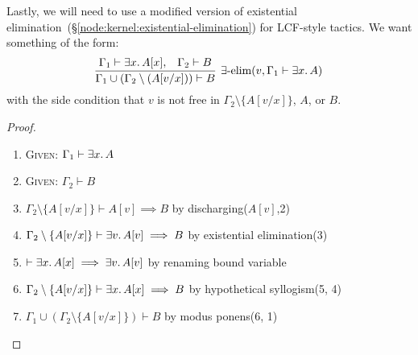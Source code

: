 \begin{node}\label{node:derived:existential-elimination}
Lastly, we will need to use a modified version of existential
elimination~(\S\ref{node:kernel:existential-elimination}) for
LCF-style tactics. We want something of the form:
\begin{equation*}
\vcenter{\infer[\exists\mbox{-elim}(v,\Gamma_{1}\vdash\exists x\ldotp A)]%
  {\Gamma_{1}\cup(\Gamma_{2}\setminus(A[v/x]))\vdash B}%
  {\Gamma_{1}\vdash\exists x\ldotp A[x], & \Gamma_{2}\vdash B}}
\end{equation*}
with the side condition that $v$ is not free in $\Gamma_{2}\setminus\{A[v/x]\}$,
$A$, or $B$.
\end{node}

\begin{proof}
\begin{enumerate}
\item\textsc{Given:} $\Gamma_{1}\vdash\exists x\ldotp A$%
\item\textsc{Given:} $\Gamma_{2}\vdash B$%
\item $\Gamma_{2}\setminus\{A[v/x]\}\vdash A[v]\implies B$ by discharging($A[v]$,2)%
\item $\Gamma_{2}\setminus\{A[v/x]\}\vdash \exists v\ldotp A[v]\implies B$
  by existential elimination(3)%
\item $\vdash\exists x\ldotp A[x]\implies\exists v\ldotp A[v]$
  by renaming bound variable%
\item $\Gamma_{2}\setminus\{A[v/x]\}\vdash \exists x\ldotp A[x]\implies B$
  by hypothetical syllogism(5, 4)%
\item $\Gamma_{1}\cup(\Gamma_{2}\setminus\{A[v/x]\})\vdash B$
  by modus ponens(6, 1)\qedhere%
\end{enumerate}
\end{proof}

